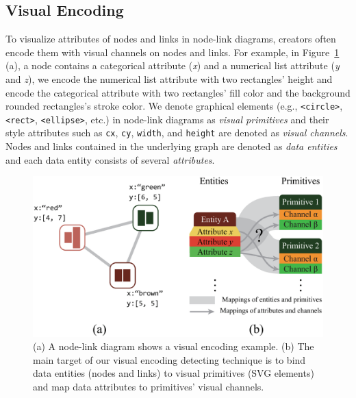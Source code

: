 \subsection{Visual Encoding}
To visualize attributes of nodes and links in node-link diagrams, creators often encode them with visual channels on nodes and links.
For example, in Figure~\ref{fig:VisualEncodings} (a), a node contains a categorical attribute (\textit{x}) and a numerical list attribute (\textit{y} and \textit{z}), we encode the numerical list attribute with two rectangles' height and encode the categorical attribute with two rectangles' fill color and the background rounded rectangles's stroke color.
We denote graphical elements (e.g., \texttt{<circle>}, \texttt{<rect>}, \texttt{<ellipse>}, etc.) in node-link diagrams as \textit{visual primitives} and their style attributes such as \texttt{cx}, \texttt{cy}, \texttt{width}, and \texttt{height} are denoted as \textit{visual channels}.
Nodes and links contained in the underlying graph are denoted as \textit{data entities} and each data entity consists of several \textit{attributes}.


\begin{figure}
    \centering
    \includegraphics[width=1\columnwidth]{figures/VisualEncodings.eps}
    \caption{(a) A node-link diagram shows a visual encoding example. (b) The main target of our visual encoding detecting technique is to bind data entities (nodes and links) to visual primitives (SVG elements) and map data attributes to primitives' visual channels.}
    \label{fig:VisualEncodings}
\end{figure}

